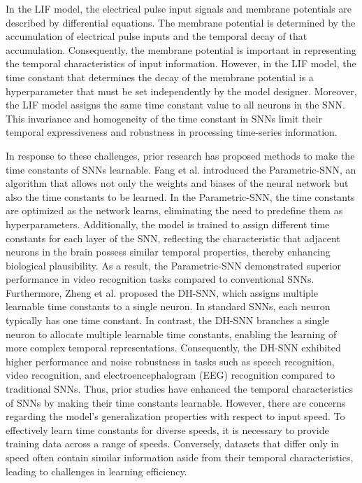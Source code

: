 In the LIF model, the electrical pulse input signals and membrane potentials are described by differential equations. 
The membrane potential is determined by the accumulation of electrical pulse inputs and the temporal decay of that accumulation. 
Consequently, the membrane potential is important in representing the temporal characteristics of input information. 
However, in the LIF model, the time constant that determines the decay of the membrane potential is a hyperparameter that must be set independently by the model designer. 
Moreover, the LIF model assigns the same time constant value to all neurons in the SNN. 
This invariance and homogeneity of the time constant in SNNs limit their temporal expressiveness and robustness in processing time-series information.

In response to these challenges, prior research has proposed methods to make the time constants of SNNs learnable. 
Fang et al. introduced the Parametric-SNN, an algorithm that allows not only the weights and biases of the neural network but also the time constants to be learned. 
In the Parametric-SNN, the time constants are optimized as the network learns, eliminating the need to predefine them as hyperparameters. 
Additionally, the model is trained to assign different time constants for each layer of the SNN, reflecting the characteristic that adjacent neurons in the brain possess similar temporal properties, thereby enhancing biological plausibility. 
As a result, the Parametric-SNN demonstrated superior performance in video recognition tasks compared to conventional SNNs.
Furthermore, Zheng et al. proposed the DH-SNN, which assigns multiple learnable time constants to a single neuron. 
In standard SNNs, each neuron typically has one time constant. 
In contrast, the DH-SNN branches a single neuron to allocate multiple learnable time constants, enabling the learning of more complex temporal representations. 
Consequently, the DH-SNN exhibited higher performance and noise robustness in tasks such as speech recognition, video recognition, and electroencephalogram (EEG) recognition compared to traditional SNNs.
Thus, prior studies have enhanced the temporal characteristics of SNNs by making their time constants learnable. 
However, there are concerns regarding the model's generalization properties with respect to input speed. 
To effectively learn time constants for diverse speeds, it is necessary to provide training data across a range of speeds. 
Conversely, datasets that differ only in speed often contain similar information aside from their temporal characteristics, leading to challenges in learning efficiency.

